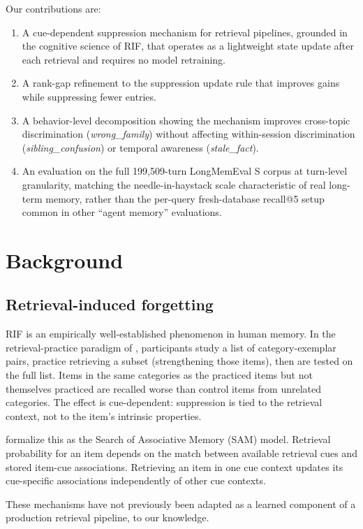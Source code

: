 \documentclass[11pt,a4paper]{article}
\begin{document}
Our contributions are:
\begin{enumerate}
  \item A cue-dependent suppression mechanism for retrieval pipelines, grounded in the cognitive science of RIF, that operates as a lightweight state update after each retrieval and requires no model retraining.
  \item A rank-gap refinement to the suppression update rule that improves gains while suppressing fewer entries.
  \item A behavior-level decomposition showing the mechanism improves cross-topic discrimination (\emph{wrong\_family}) without affecting within-session discrimination (\emph{sibling\_confusion}) or temporal awareness (\emph{stale\_fact}).
  \item An evaluation on the full 199{,}509-turn LongMemEval S corpus at turn-level granularity, matching the needle-in-haystack scale characteristic of real long-term memory, rather than the per-query fresh-database recall@5 setup common in other ``agent memory'' evaluations.
\end{enumerate}

\section{Background}

\subsection{Retrieval-induced forgetting}

RIF is an empirically well-established phenomenon in human memory. In the retrieval-practice paradigm of \citet{anderson1994rif}, participants study a list of category-exemplar pairs, practice retrieving a subset (strengthening those items), then are tested on the full list. Items in the same categories as the practiced items but not themselves practiced are recalled worse than control items from unrelated categories. The effect is cue-dependent: suppression is tied to the retrieval context, not to the item's intrinsic properties.

\citet{raaijmakers1981sam} formalize this as the Search of Associative Memory (SAM) model. Retrieval probability for an item depends on the match between available retrieval cues and stored item-cue associations. Retrieving an item in one cue context updates its cue-specific associations independently of other cue contexts.

These mechanisms have not previously been adapted as a learned component of a production retrieval pipeline, to our knowledge.
\end{document}
